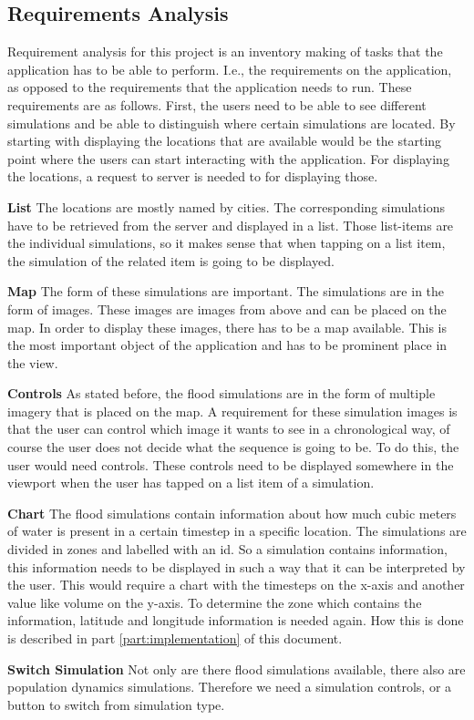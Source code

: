 \subsection{Requirements Analysis}
\label{sec:requirements}
Requirement analysis for this project is an inventory making of tasks that the application has to be able to perform. I.e., the requirements on the application, as opposed to the requirements that the application needs to run. These requirements are as follows. First, the users need to be able to see different simulations and be able to distinguish where certain simulations are located. By starting with displaying the locations that are available would be the starting point where the users can start interacting with the application. For displaying the locations, a request to server is needed to for displaying those.
\begin{description}
\item \textbf{List}
The locations are mostly named by cities. The corresponding simulations have to be retrieved from the server and displayed in a list. Those list-items are the individual simulations, so it makes sense that when tapping on a list item, the simulation of the related item is going to be displayed. 
\item \textbf{Map}
The form of these simulations are important. The simulations are in the form of images. These images are images from above and can be placed on the map. In order to display these images, there has to be a map available. This is the most important object of the application and has to be prominent place in the view.
\item \textbf{Controls}
As stated before, the flood simulations are in the form of multiple imagery that is placed on the map. A requirement for these simulation images is that the user can control which image it wants to see in a chronological way, of course the user does not decide what the sequence is going to be. To do this, the user would need controls. These controls need to be displayed somewhere in the viewport when the user has tapped on a list item of a simulation.
\item \textbf{Chart}
The flood simulations contain information about how much cubic meters of water is present in a certain timestep in a specific location. The simulations are divided in zones and labelled with an id. So a simulation contains information, this information needs to be displayed in such a way that it can be interpreted by the user. This would require a chart with the timesteps on the x-axis and another value like volume on the y-axis. To determine the zone which contains the information, latitude and longitude information is needed again. How this is done is described in part \ref{part:implementation} of this document.
\item \textbf{Switch Simulation} 
Not only are there flood simulations available, there also are population dynamics simulations. Therefore we need a simulation controls, or a button to switch from simulation type.

\end{description}
